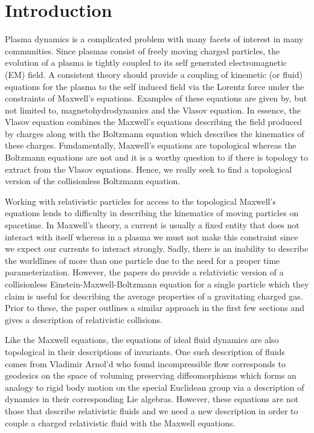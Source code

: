 \documentclass[conf]{new-aiaa}
\begin{document}
\section{Introduction}
Plasma dynamics is a complicated problem with many facets of interest in many communities. Since plasmas consist of freely moving charged particles, the evolution of a plasma is tightly coupled to its self generated electromagnetic (EM) field. A consistent theory should provide a coupling of kinemetic (or fluid) equations for the plasma to the self induced field via the Lorentz force under the constraints of Maxwell's equations. Examples of these equations are given by, but not limited to, magnetohydrodynamics and the Vlasov equation. In essence, the Vlasov equation combines the Maxwell's equations describing the field produced by charges along with the Boltzmann equation which describes the kinematics of these charges. Fundamentally, Maxwell's equations are topological \cite{delphenich_axioms_2005, hehl_foundations_2003} whereas the Boltzmann equations are not and it is a worthy question to if there is topology to extract from the Vlasov equations. Hence, we really seek to find a topological version of the collisionless Boltzmann equation.

Working with relativistic particles for access to the topological Maxwell's equations lends to difficulty in describing the kinematics of moving particles on spacetime. In Maxwell's theory, a current is usually a fixed entity that does not interact with itself whereas in a plasma we must not make this constraint since we expect our currents to interact strongly. Sadly, there is an inability to describe the worldlines of more than one particle due to the need for a proper time parameterization. However, the papers \cite{sarbach_relativistic_2013, sarbach_tangent_2014, sarbach_geometry_2014} do provide a relativistic version of a collisionless Einstein-Maxwell-Boltzmann equation for a single particle which they claim is useful for describing the average properties of a gravitating charged gas. Prior to these, the paper \cite{bichteler_cauchy_1967} outlines a similar approach in the first few sections and gives a description of relativistic collisions.

Like the Maxwell equations, the equations of ideal fluid dynamics are also topological in their descriptions of invariants. One such description of fluids comes from Vladimir Arnol'd who found incompressible flow corresponds to geodesics on the space of voluming preserving diffeomorphisms which forms an analogy to rigid body motion on the special Euclidean group via a description of dynamics in their corresponding Lie algebras. However, these equations are not those that describe relativistic fluids and we need a new description in order to couple a charged relativistic fluid with the Maxwell equations.
\end{document}
